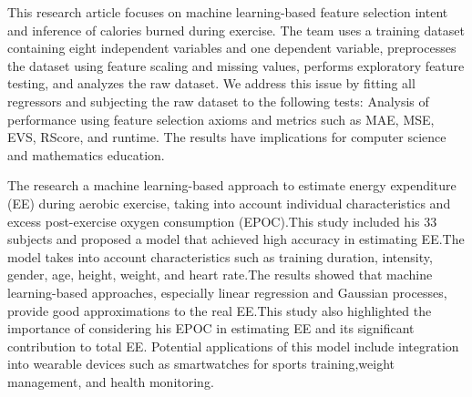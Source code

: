 \documentclass[conference]{IEEEtran}
\begin{document}
\newline
 This research  article focuses on machine learning-based feature selection intent and inference of calories burned during exercise.
 The team uses a training dataset containing eight independent variables and one dependent variable, preprocesses the dataset using feature scaling and missing values, performs exploratory feature testing, and analyzes the raw dataset.
 We address this issue by fitting all regressors and subjecting the raw dataset to the following tests: Analysis of performance using feature selection axioms and  metrics such as MAE, MSE, EVS, RScore, and runtime.
The results have implications for computer science and mathematics education.
\newline

\newline

The research a machine learning-based approach to estimate energy expenditure (EE) during aerobic exercise, taking into account individual characteristics and excess post-exercise oxygen consumption (EPOC).This study included his 33 subjects and proposed a model that achieved high accuracy in estimating EE.The model takes into account characteristics such as training duration, intensity, gender, age, height, weight, and heart rate.The results showed that  machine learning-based approaches, especially linear regression and Gaussian processes, provide good approximations to the real EE.This study also highlighted the importance of considering his EPOC in estimating EE  and its significant contribution to total EE. Potential applications of this model include integration into wearable devices such as smartwatches for sports training,weight management, and health monitoring.
\newline
\end{document}
